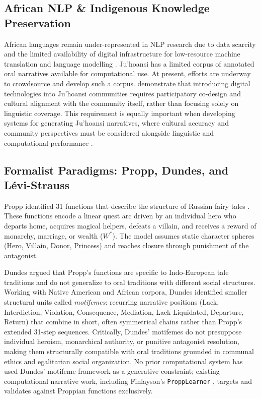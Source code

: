 \documentclass[pdflatex,sn-mathphys-num]{sn-jnl}%
\newcommand{\juhoansi}{\mbox{Ju\textbar{}'hoansi}}%
\theoremstyle{thmstyleone}%
\theoremstyle{thmstyletwo}%
\theoremstyle{thmstylethree}%
\begin{document}
\subsection{African NLP \& Indigenous Knowledge Preservation}

African languages remain under-represented in NLP research due to data scarcity and the limited availability of digital infrastructure for low-resource machine translation and language modelling \cite{Adelani2022,Lo}. \juhoansi{} has a limited corpus of annotated oral narratives available for computational use. At present, efforts are underway to crowdsource and develop such a corpus. \cite{indongo2026designing} demonstrate that introducing digital technologies into \juhoansi{} communities requires participatory co-design and cultural alignment with the community itself, rather than focusing solely on linguistic coverage. This requirement is equally important when developing systems for generating \juhoansi{} narratives, where cultural accuracy and community perspectives must be considered alongside linguistic and computational performance \cite{indongo2025mirror}.


\subsection{Formalist Paradigms: Propp, Dundes, and Lévi-Strauss}

Propp identified 31 functions that describe the structure of Russian fairy tales \cite{propp1928morphology}. These functions encode a linear quest arc driven by an individual hero who departs home, acquires magical helpers, defeats a villain, and receives a reward of monarchy, marriage, or wealth ($W^*$). The model assumes static character spheres (Hero, Villain, Donor, Princess) and reaches closure through punishment of the antagonist.

Dundes \cite{dundes1964morphology} argued that Propp's functions are specific to Indo-European tale traditions and do not generalize to oral traditions with different social structures. Working with Native American and African corpora, Dundes identified smaller structural units called \textit{motifemes}: recurring narrative positions (Lack, Interdiction, Violation, Consequence, Mediation, Lack Liquidated, Departure, Return) that combine in short, often symmetrical chains rather than Propp's extended 31-step sequences. Critically, Dundes' motifemes do not presuppose individual heroism, monarchical authority, or punitive antagonist resolution, making them structurally compatible with oral traditions grounded in communal ethics and egalitarian social organization. No prior computational system has used Dundes' motifeme framework as a generative constraint; existing computational narrative work, including Finlayson's \texttt{ProppLearner} \cite{finlayson2012learning,finlayson2017propplearner}, targets and validates against Proppian functions exclusively.
\end{document}
